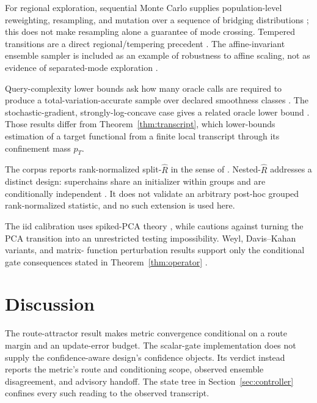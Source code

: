 \documentclass[11pt]{article}
\theoremstyle{plain}
\theoremstyle{definition}
\theoremstyle{remark}
\newcommand{\Rhat}{\widehat R}
\begin{document}
For regional exploration, sequential Monte Carlo supplies population-level
reweighting, resampling, and mutation over a sequence of bridging distributions
\citep{delmoral2006smc}; this does not make resampling alone a guarantee of
mode crossing. Tempered transitions are a direct regional/tempering precedent
\citep{neal1996tempered}.
The affine-invariant ensemble sampler is included as an example of robustness
to affine scaling, not as evidence of separated-mode exploration
\citep{goodman2010ensemble}.

Query-complexity lower bounds ask how many oracle calls are required to produce
a total-variation-accurate sample over declared smoothness classes
\citep{chewi2022query,he2025query}. The stochastic-gradient,
strongly-log-concave case gives a related oracle lower bound
\citep{chatterji2022oracle}. Those results differ from
Theorem~\ref{thm:transcript}, which lower-bounds estimation of a target
functional from a finite local transcript through its confinement mass $p_T$.

The corpus reports rank-normalized split-$\Rhat$ in the sense of
\citet{vehtari2021rank}. Nested-$\Rhat$ addresses a distinct design:
superchains share an initializer within groups and are conditionally
independent \citep{margossian2025nested}. It does not validate an arbitrary
post-hoc grouped rank-normalized statistic, and no such extension is used here.

The iid calibration uses spiked-PCA theory
\citep{baik2005phase,baik2006eigenvalues,paul2007asymptotics}, while
\citet{onatski2013asymptotic} cautions against turning the PCA transition into
an unrestricted testing impossibility. Weyl, Davis--Kahan variants, and matrix-
function perturbation results support only the conditional gate consequences
stated in Theorem~\ref{thm:operator}
\citep{bhatia1997matrix,yu2015useful,higham2008functions}.

\section{Discussion}\label{sec:discussion}

The route-attractor result makes metric convergence conditional on a route
margin and an update-error budget. The scalar-gate implementation does not
supply the confidence-aware design's confidence objects. Its verdict instead
reports the metric's route and conditioning scope, observed ensemble
disagreement, and advisory handoff. The state tree in
Section~\ref{sec:controller} confines every such reading to the observed
transcript.
\end{document}
